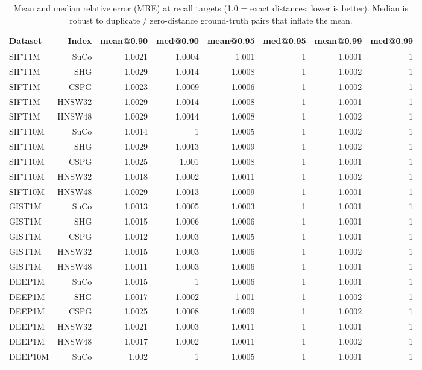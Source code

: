 \begin{table}[t]
\centering
\small
\caption{Mean and median relative error (MRE) at recall targets (1.0 = exact distances; lower is better). Median is robust to duplicate / zero-distance ground-truth pairs that inflate the mean.}
\label{tab:mre}
\begin{tabular}{lrrrrrrr}
\toprule
Dataset & Index & mean@0.90 & med@0.90 & mean@0.95 & med@0.95 & mean@0.99 & med@0.99 \\
\midrule
SIFT1M & SuCo & 1.0021 & 1.0004 & 1.001 & 1 & 1.0001 & 1 \\
SIFT1M & SHG & 1.0029 & 1.0014 & 1.0008 & 1 & 1.0002 & 1 \\
SIFT1M & CSPG & 1.0023 & 1.0009 & 1.0006 & 1 & 1.0002 & 1 \\
SIFT1M & HNSW32 & 1.0029 & 1.0014 & 1.0008 & 1 & 1.0001 & 1 \\
SIFT1M & HNSW48 & 1.0029 & 1.0014 & 1.0008 & 1 & 1.0002 & 1 \\
SIFT10M & SuCo & 1.0014 & 1 & 1.0005 & 1 & 1.0002 & 1 \\
SIFT10M & SHG & 1.0029 & 1.0013 & 1.0009 & 1 & 1.0002 & 1 \\
SIFT10M & CSPG & 1.0025 & 1.001 & 1.0008 & 1 & 1.0001 & 1 \\
SIFT10M & HNSW32 & 1.0018 & 1.0002 & 1.0011 & 1 & 1.0002 & 1 \\
SIFT10M & HNSW48 & 1.0029 & 1.0013 & 1.0009 & 1 & 1.0001 & 1 \\
GIST1M & SuCo & 1.0013 & 1.0005 & 1.0003 & 1 & 1.0001 & 1 \\
GIST1M & SHG & 1.0015 & 1.0006 & 1.0006 & 1 & 1.0001 & 1 \\
GIST1M & CSPG & 1.0012 & 1.0003 & 1.0005 & 1 & 1.0001 & 1 \\
GIST1M & HNSW32 & 1.0015 & 1.0003 & 1.0006 & 1 & 1.0002 & 1 \\
GIST1M & HNSW48 & 1.0011 & 1.0003 & 1.0006 & 1 & 1.0001 & 1 \\
DEEP1M & SuCo & 1.0015 & 1 & 1.0006 & 1 & 1.0001 & 1 \\
DEEP1M & SHG & 1.0017 & 1.0002 & 1.001 & 1 & 1.0002 & 1 \\
DEEP1M & CSPG & 1.0025 & 1.0008 & 1.0009 & 1 & 1.0002 & 1 \\
DEEP1M & HNSW32 & 1.0021 & 1.0003 & 1.0011 & 1 & 1.0001 & 1 \\
DEEP1M & HNSW48 & 1.0017 & 1.0002 & 1.0011 & 1 & 1.0002 & 1 \\
DEEP10M & SuCo & 1.002 & 1 & 1.0005 & 1 & 1.0001 & 1 \\

\end{tabular}
\end{table}
